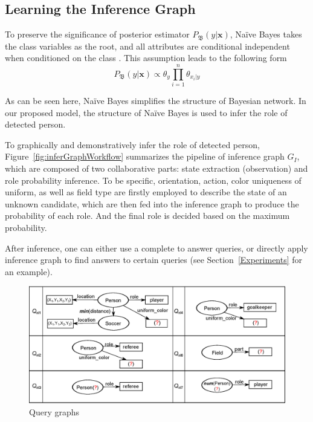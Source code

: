 \subsection{Learning the Inference Graph}
To preserve the significance of posterior estimator $P_\mathfrak{B}(y|\mathbf{x})$, 
Na\"{i}ve Bayes takes the class variables as the root, and all attributes are conditional independent when conditioned on the class \cite{petitjean2018accurate}. This assumption leads to the following form
\vspace{-1ex}
\begin{equation}\label{eq:BN-naiveBayes}
P_\mathfrak{B}(y|\mathbf{x}) \propto \theta_y \prod_{i=1}^{n}\theta_{x_i|y}
\end{equation}
\vspace{-1ex}

As can be seen here, Na\"{i}ve Bayes simplifies the structure of Bayesian network. In our proposed model, the structure of Na\"{i}ve Bayes is used to infer %
the role of detected person.   %



To graphically and demonstratively infer the role of detected person,  Figure~\ref{fig:inferGraphWorkflow} summarizes the pipeline of inference graph $G_I$, which are composed of two collaborative parts: state extraction (observation) and role probability inference. To be specific, orientation, action, color uniqueness of uniform, as well as field type are firstly employed to describe the state of an unknown candidate, which are then fed into the inference graph to produce the probability of each role. 
And the final role is decided based on the maximum probability. 

After inference, one can either use a complete  to answer queries, or directly apply inference graph to find answers to certain queries (see Section~\ref{Experiments} for an example). 


\begin{figure}[tb!]
\centering
\includegraphics[width=\columnwidth]{./figure/queries.eps}
\caption{Query graphs}
\label{fig:queries}
\end{figure}